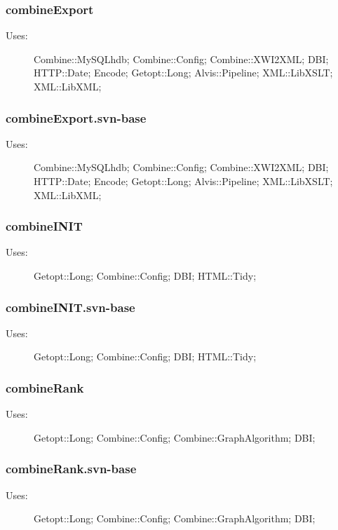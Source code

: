 \subsubsection{combineExport}
\begin{description}
\item[Uses:] Combine::MySQLhdb; Combine::Config; Combine::XWI2XML; DBI; HTTP::Date; Encode; Getopt::Long; Alvis::Pipeline; XML::LibXSLT; XML::LibXML; 

\end{description}
\subsubsection{combineExport.svn-base}
\begin{description}
\item[Uses:] Combine::MySQLhdb; Combine::Config; Combine::XWI2XML; DBI; HTTP::Date; Encode; Getopt::Long; Alvis::Pipeline; XML::LibXSLT; XML::LibXML; 

\end{description}
\subsubsection{combineINIT}
\begin{description}
\item[Uses:] Getopt::Long; Combine::Config; DBI; HTML::Tidy; 

\end{description}
\subsubsection{combineINIT.svn-base}
\begin{description}
\item[Uses:] Getopt::Long; Combine::Config; DBI; HTML::Tidy; 

\end{description}
\subsubsection{combineRank}
\begin{description}
\item[Uses:] Getopt::Long; Combine::Config; Combine::GraphAlgorithm; DBI; 

\end{description}
\subsubsection{combineRank.svn-base}
\begin{description}
\item[Uses:] Getopt::Long; Combine::Config; Combine::GraphAlgorithm; DBI; 

\end{description}
